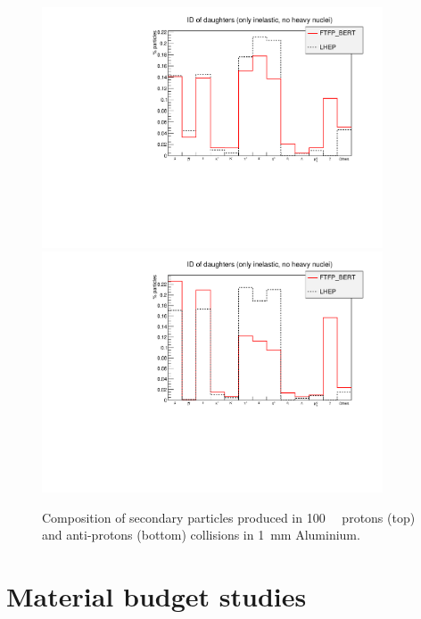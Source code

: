 \begin{center}
\begin{figure}[h!]
\centering \includegraphics[width=0.9\textwidth]{Detector/figs/validation/perc_pbarcomp.pdf}
\includegraphics[width=0.9\textwidth]{Detector/figs/validation/perc_pcomp.pdf}
\caption{Composition of secondary particles produced in 100~\gev~ protons (top)
and anti-protons (bottom) collisions in 1~mm Aluminium.}
\end{figure}
\label{fig:IDs_valdation}
\end{center}

\clearpage
\section{Material budget studies}

